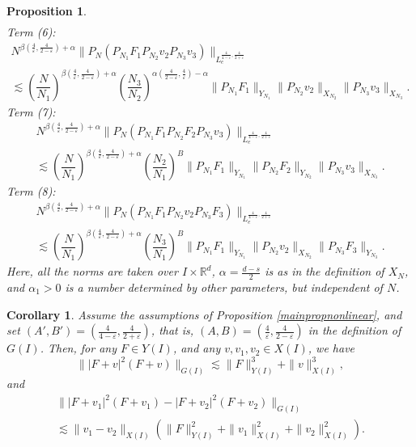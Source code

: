 \documentclass[10pt,leqno]{amsart}
\newtheorem{prop}[thm]{Proposition}
\newtheorem{cor}[thm]{Corollary}
\newcommand{\R}{\mathbb{R}}
\numberwithin{equation}{section}
\begin{document}
\begin{prop}
\begin{multline*}
\end{multline*}
\noindent
Term (6):
\begin{multline*}
N^{\beta (\frac{4}{\varepsilon},\frac{4}{2-\varepsilon}) +\alpha} \|P_N (P_{N_1} F_1 P_{N_2} v_2 P_{N_3} v_3) \|_{L_e^{\frac{4}{4-\varepsilon} , \frac{4}{2+\varepsilon}} }\\
 \lesssim \left(\dfrac{N}{N_1}\right)^{\beta (\frac{4}{\varepsilon},\frac{4}{2-\varepsilon})+\alpha} \left(\dfrac{N_3}{N_2}\right)^{\alpha  (\frac{4}{2-\varepsilon},\frac{4}{\varepsilon}) -\alpha} \|P_{N_1}F_1\|_{Y_{N_1}}\|P_{N_2}v_2\|_{X_{N_2}} \|P_{N_3}v_3\|_{X_{N_3}}.  
\end{multline*}
\noindent
Term (7):
\begin{multline*}
N^{\beta (\frac{4}{\varepsilon},\frac{4}{2-\varepsilon}) +\alpha} \|P_N (P_{N_1} F_1 P_{N_2} F_2 P_{N_3} v_3) \|_{L_e^{\frac{4}{4-\varepsilon} , \frac{4}{2+\varepsilon}} }\\
 \lesssim \left(\dfrac{N}{N_1}\right)^{\beta  (\frac{4}{\varepsilon},\frac{4}{2-\varepsilon})+\alpha} \left(\dfrac{N_2}{N_1}\right)^{B} \|P_{N_1}F_1\|_{Y_{N_1}}\|P_{N_2}F_2\|_{Y_{N_2}} \|P_{N_3}v_3\|_{X_{N_3}}.  
\end{multline*}
\noindent
Term (8):
\begin{multline*}
N^{\beta (\frac{4}{\varepsilon},\frac{4}{2-\varepsilon}) +\alpha} \|P_N (P_{N_1} F_1 P_{N_2} v_2 P_{N_3} F_3) \|_{L_e^{\frac{4}{4-\varepsilon} , \frac{4}{2+\varepsilon}} }\\
 \lesssim \left(\dfrac{N}{N_1}\right)^{\beta  (\frac{4}{\varepsilon},\frac{4}{2-\varepsilon})+\alpha} \left(\dfrac{N_3}{N_1}\right)^{B} \|P_{N_1}F_1\|_{Y_{N_1}}\|P_{N_2}v_2\|_{X_{N_2}} \|P_{N_3}F_3\|_{Y_{N_3}}.  
\end{multline*}
Here, all the norms are taken over $I\times \R^d$, $\alpha = \frac{d-s}{2}$ is as in the definition of $X_N$, and $\alpha_1>0$
is a number determined by other parameters, but independent of $N$. 
\end{prop}

\begin{cor}\label{cor:wis}
Assume the assumptions of Proposition \ref{mainpropnonlinear}, and set $(A', B') = (\frac{4}{4 - \varepsilon}, \frac{4}{2 + \varepsilon})$, that is, $(A, B) = (\frac{4}{\varepsilon}, \frac{4}{2 - \varepsilon})$ 
in the definition of $G(I)$. Then, 
for any $F\in Y(I)$, and any $v,v_1,v_2\in X(I)$, we have
$$\||F+v|^2 (F+v)\|_{G(I)}\lesssim \|F\|_{Y(I)}^3 +\|v\|_{X(I)}^3,$$
and
\begin{multline*}
\||F+v_1|^2 (F+v_1) - |F+v_2|^2 (F+v_2) \|_{G(I)} \\
\lesssim \|v_1 - v_2\|_{X(I)} (\|F\|^2_{Y(I)} +\|v_1\|_{X(I)}^2 +\|v_2\|_{X(I)}^2).
\end{multline*}
\end{cor}
\end{document}
